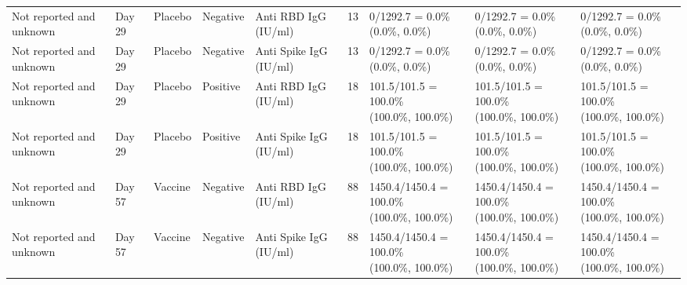 \documentclass[]{book}
\theoremstyle{definition}
\theoremstyle{definition}
\theoremstyle{definition}
\newcommand{\1}{\mathbbm{1}}
\begin{document}
\begin{landscape}
\begin{ThreePartTable}
\begin{longtable}[t]{>{\raggedright\arraybackslash}p{2.7cm}llllllll}
\hspace{1em}Not reported and unknown & Day 29 & Placebo & Negative & Anti RBD IgG (IU/ml) & 13 & \makecell[l]{0/1292.7 = 0.0\%\\(0.0\%, 0.0\%)} & \makecell[l]{0/1292.7 = 0.0\%\\(0.0\%, 0.0\%)} & \makecell[l]{0/1292.7 = 0.0\%\\(0.0\%, 0.0\%)}\\
\hspace{1em}Not reported and unknown & Day 29 & Placebo & Negative & Anti Spike IgG (IU/ml) & 13 & \makecell[l]{0/1292.7 = 0.0\%\\(0.0\%, 0.0\%)} & \makecell[l]{0/1292.7 = 0.0\%\\(0.0\%, 0.0\%)} & \makecell[l]{0/1292.7 = 0.0\%\\(0.0\%, 0.0\%)}\\
\hspace{1em}Not reported and unknown & Day 29 & Placebo & Positive & Anti RBD IgG (IU/ml) & 18 & \makecell[l]{101.5/101.5 = 100.0\%\\(100.0\%, 100.0\%)} & \makecell[l]{101.5/101.5 = 100.0\%\\(100.0\%, 100.0\%)} & \makecell[l]{101.5/101.5 = 100.0\%\\(100.0\%, 100.0\%)}\\
\hspace{1em}Not reported and unknown & Day 29 & Placebo & Positive & Anti Spike IgG (IU/ml) & 18 & \makecell[l]{101.5/101.5 = 100.0\%\\(100.0\%, 100.0\%)} & \makecell[l]{101.5/101.5 = 100.0\%\\(100.0\%, 100.0\%)} & \makecell[l]{101.5/101.5 = 100.0\%\\(100.0\%, 100.0\%)}\\
\hspace{1em}Not reported and unknown & Day 57 & Vaccine & Negative & Anti RBD IgG (IU/ml) & 88 & \makecell[l]{1450.4/1450.4 = 100.0\%\\(100.0\%, 100.0\%)} & \makecell[l]{1450.4/1450.4 = 100.0\%\\(100.0\%, 100.0\%)} & \makecell[l]{1450.4/1450.4 = 100.0\%\\(100.0\%, 100.0\%)}\\
\hspace{1em}Not reported and unknown & Day 57 & Vaccine & Negative & Anti Spike IgG (IU/ml) & 88 & \makecell[l]{1450.4/1450.4 = 100.0\%\\(100.0\%, 100.0\%)} & \makecell[l]{1450.4/1450.4 = 100.0\%\\(100.0\%, 100.0\%)} & \makecell[l]{1450.4/1450.4 = 100.0\%\\(100.0\%, 100.0\%)}\\

\end{longtable}
\end{ThreePartTable}
\end{landscape}
\end{document}
